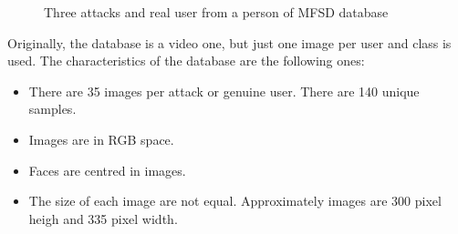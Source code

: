 \begin{figure}[htb]
\centering
{}

\caption{Three attacks and  real user from a person of MFSD database } \label{fig:mfsd}
\end{figure}

Originally, the database is a video one, but just one image per user and class is used. The characteristics of the database are the following ones:
\begin{itemize}[noitemsep,topsep=8pt,parsep=0pt,partopsep=20pt]
\item There are 35 images per attack or genuine user. There are 140 unique samples.
\item Images are in RGB space.
\item Faces are centred in images.
\item The size of each image are not equal. Approximately images are 300 pixel heigh and 335 pixel width.
\end{itemize}

